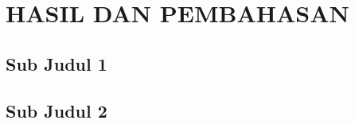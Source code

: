 \section{HASIL DAN PEMBAHASAN}

\subsection{Sub Judul 1}
\PlaceholderParShort

\subsection{Sub Judul 2}
\PlaceholderParShort
